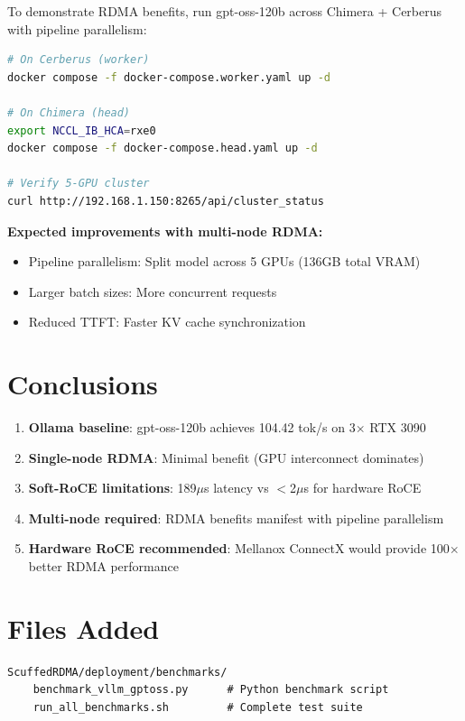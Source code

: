 \documentclass[10pt,letterpaper]{article}
\begin{document}
To demonstrate RDMA benefits, run gpt-oss-120b across Chimera + Cerberus with pipeline parallelism:

\begin{lstlisting}[language=bash]
# On Cerberus (worker)
docker compose -f docker-compose.worker.yaml up -d

# On Chimera (head)
export NCCL_IB_HCA=rxe0
docker compose -f docker-compose.head.yaml up -d

# Verify 5-GPU cluster
curl http://192.168.1.150:8265/api/cluster_status
\end{lstlisting}

\textbf{Expected improvements with multi-node RDMA:}
\begin{itemize}[noitemsep]
    \item Pipeline parallelism: Split model across 5 GPUs (136GB total VRAM)
    \item Larger batch sizes: More concurrent requests
    \item Reduced TTFT: Faster KV cache synchronization
\end{itemize}

\section{Conclusions}

\begin{enumerate}[noitemsep]
    \item \textbf{Ollama baseline}: gpt-oss-120b achieves 104.42 tok/s on 3$\times$ RTX 3090
    \item \textbf{Single-node RDMA}: Minimal benefit (GPU interconnect dominates)
    \item \textbf{Soft-RoCE limitations}: 189$\mu$s latency vs $<$2$\mu$s for hardware RoCE
    \item \textbf{Multi-node required}: RDMA benefits manifest with pipeline parallelism
    \item \textbf{Hardware RoCE recommended}: Mellanox ConnectX \cite{mofed-docs} would provide 100$\times$ better RDMA performance
\end{enumerate}

\section{Files Added}

\begin{lstlisting}
ScuffedRDMA/deployment/benchmarks/
    benchmark_vllm_gptoss.py      # Python benchmark script
    run_all_benchmarks.sh         # Complete test suite
\end{lstlisting}
\end{document}
